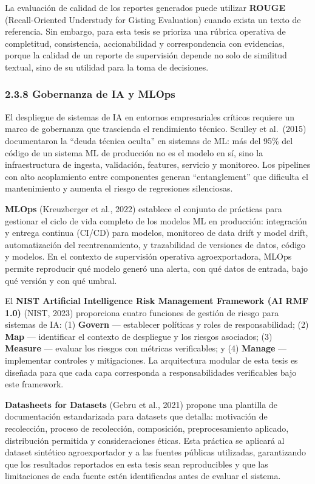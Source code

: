 La evaluación de calidad de los reportes generados puede utilizar
\textbf{ROUGE} (Recall-Oriented Understudy for Gisting Evaluation)
cuando exista un texto de referencia. Sin embargo, para esta tesis se
prioriza una rúbrica operativa de completitud, consistencia,
accionabilidad y correspondencia con evidencias, porque la calidad de un
reporte de supervisión depende no solo de similitud textual, sino de su
utilidad para la toma de decisiones.

\subsubsection{2.3.8 Gobernanza de IA y
MLOps}\label{gobernanza-de-ia-y-mlops}

El despliegue de sistemas de IA en entornos empresariales críticos
requiere un marco de gobernanza que trascienda el rendimiento técnico.
Sculley et al.~(2015) documentaron la ``deuda técnica oculta'' en
sistemas de ML: más del 95\% del código de un sistema ML de producción
no es el modelo en sí, sino la infraestructura de ingesta, validación,
features, servicio y monitoreo. Los pipelines con alto acoplamiento
entre componentes generan ``entanglement'' que dificulta el
mantenimiento y aumenta el riesgo de regresiones silenciosas.

\textbf{MLOps} (Kreuzberger et al., 2022) establece el conjunto de
prácticas para gestionar el ciclo de vida completo de los modelos ML en
producción: integración y entrega continua (CI/CD) para modelos,
monitoreo de data drift y model drift, automatización del
reentrenamiento, y trazabilidad de versiones de datos, código y modelos.
En el contexto de supervisión operativa agroexportadora, MLOps permite
reproducir qué modelo generó una alerta, con qué datos de entrada, bajo
qué versión y con qué umbral.

El \textbf{NIST Artificial Intelligence Risk Management Framework (AI
RMF 1.0)} (NIST, 2023) proporciona cuatro funciones de gestión de riesgo
para sistemas de IA: (1) \textbf{Govern} --- establecer políticas y
roles de responsabilidad; (2) \textbf{Map} --- identificar el contexto
de despliegue y los riesgos asociados; (3) \textbf{Measure} --- evaluar
los riesgos con métricas verificables; y (4) \textbf{Manage} ---
implementar controles y mitigaciones. La arquitectura modular de esta
tesis es diseñada para que cada capa corresponda a responsabilidades
verificables bajo este framework.

\textbf{Datasheets for Datasets} (Gebru et al., 2021) propone una
plantilla de documentación estandarizada para datasets que detalla:
motivación de recolección, proceso de recolección, composición,
preprocesamiento aplicado, distribución permitida y consideraciones
éticas. Esta práctica se aplicará al dataset sintético agroexportador y
a las fuentes públicas utilizadas, garantizando que los resultados
reportados en esta tesis sean reproducibles y que las limitaciones de
cada fuente estén identificadas antes de evaluar el sistema.

